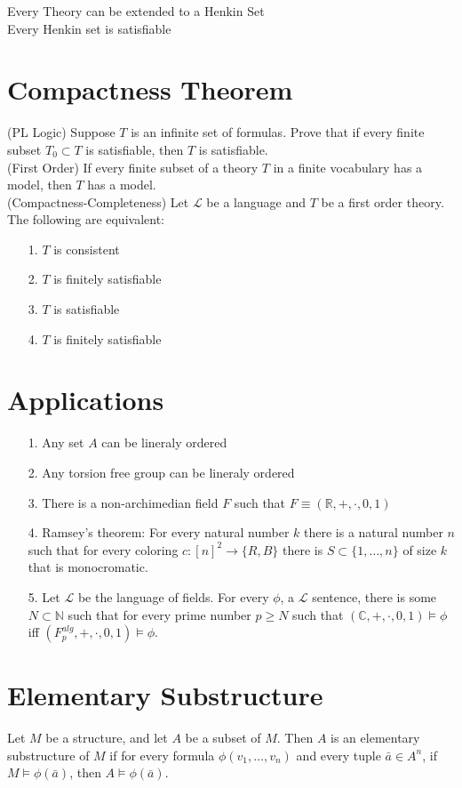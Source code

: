 \documentclass[10pt]{article}
\begin{document}
Every Theory can be extended to a Henkin Set\\
Every Henkin set is satisfiable\\
\section*{Compactness Theorem}
(PL Logic) Suppose $T$ is an infinite set of formulas. Prove that if every finite subset $T_0\subset T$ is satisfiable, then $T$ is satisfiable.\\
(First Order) If every finite subset of a theory $T$ in a finite vocabulary has a model, then $T$ has a model.\\
(Compactness-Completeness) Let $\mathcal{L}$ be a language and $T$ be a first order theory. The following are equivalent:\\
\begin{itemize}
    \item [1.] $T$ is consistent
    \item [2.] $T$ is finitely satisfiable
    \item [3.] $T$ is satisfiable
    \item [4.] $T$ is finitely satisfiable
\end{itemize}
\section*{Applications}
\begin{itemize}
    \item [1.] Any set $A$ can be lineraly ordered
    \item [2.] Any torsion free group can be lineraly ordered
    \item [3.] There is a non-archimedian field $F$ such that $F\equiv(\mathbb{R},+,\cdot,0,1)$
    \item [4.] Ramsey's theorem: For every natural number $k$ there is a natural number $n$ such that for every coloring $c:{[n]}^2\rightarrow\{R,B\}$ there is $S\subset\{1,\ldots,n\}$ of size $k$ that is monocromatic.
    \item [5.] Let $\mathcal{L}$ be the language of fields. For every $\phi$, a $\mathcal{L}$ sentence, there is some $N\subset\mathbb{N}$ such that for every prime number $p\ge N$ such that $(\mathbb{C},+,\cdot,0,1)\models\phi$ iff $(F^{alg}_p,+,\cdot,0,1)\models\phi$.  
\end{itemize}
\section*{Elementary Substructure}
Let $M$ be a structure, and let $A$ be a subset of $M$. 
Then $A$ is an elementary substructure of $M$ if for every formula $\phi(v_1, \dots, v_n)$ and every tuple $\bar{a} \in A^n$, if $M \models \phi(\bar{a})$, then $A \models \phi(\bar{a})$.
\end{document}
